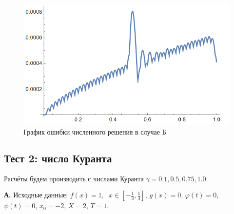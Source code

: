 \documentclass[12pt, a4paper]{article}
\begin{document}
	\begin{figure}[H]
		\centering
		\includegraphics[width=1\textwidth]{errors2}
		\caption{График ошибки численного решения в случае Б}
	\end{figure}

	\subsection{Тест 2: число Куранта}
	
	Расчёты будем производить  с числами Куранта $\gamma = 0.1, 0.5, 0.75, 1.0$.
	
	\textbf{А.}  Исходные данные: $f(x)=1, \phantom{x} x\in [-\frac13, \frac13]$, $g(x)=0$, $\varphi(t)=0$, $\psi(t)=0$, $x_0=-2$, $X=2$, $T= 1$. 
	
\end{document}
